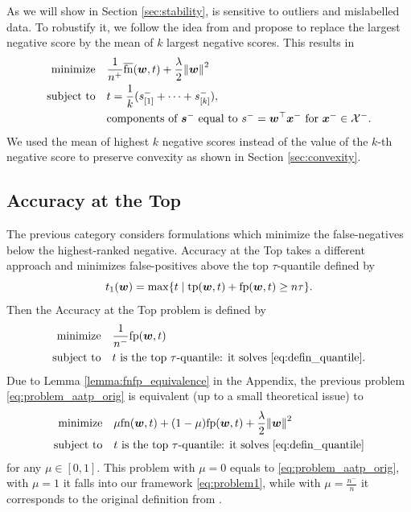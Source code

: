 As we will show in Section \ref{sec:stability}, \TopPush is sensitive to outliers and mislabelled data. To robustify it, we follow the idea from \cite{lapin2015top} and propose to replace the largest negative score by the mean of $k$ largest negative scores. This results in
\begin{equation}\label{eq:problem_toppushk}
  \begin{aligned}
    \minimize
    & \quad \frac{1}{n^{+}} \fns(\bm{w}, t) + \frac{\lambda}{2} \norm{\bm{w}}^2 \\
    \st
    & \quad t = \frac{1}{k}(s_{[1]}^- + \dots + s_{[k]}^-), \\
    & \quad \text{components of } \bm{s}^- \text{ equal to } s^-= \bm{w}^\top \bm{x}^- \text{ for }\bm{x}^- \in \Xc^-.
  \end{aligned}
\end{equation}
We used the mean of highest $k$ negative scores instead of the value of the $k$-th negative score to preserve convexity as shown in Section \ref{sec:convexity}.

\subsection{Accuracy at the Top}\label{sec:obj2}

The previous category considers formulations which minimize the false-negatives below the highest-ranked negative. Accuracy at the Top \cite{boyd2012accuracy} takes a different approach and minimizes false-positives above the top $\tau$-quantile defined by
\begin{equation}\label{eq:defin_quantile} 
  t_1(\bm{w}) = \max \Brac[c]{t \mid \tp(\bm{w}, t) + \fp(\bm{w}, t) \ge n \tau}.
\end{equation}
Then the Accuracy at the Top problem is defined by
\begin{equation}\label{eq:problem_aatp_orig}
  \begin{aligned}
    \operatorname*{minimize}
    & \quad \frac{1}{n^{-}}\textnormal{fp}(\bm{w},t) \\
    \operatorname{subject\ to}
    & \quad t \text{ is the top \ensuremath{\tau}-quantile: it solves } \eqref{eq:defin_quantile}.
  \end{aligned}
\end{equation}
Due to Lemma \ref{lemma:fnfp_equivalence} in the Appendix, the previous problem \eqref{eq:problem_aatp_orig} is equivalent (up to a small theoretical issue) to
\begin{equation}\label{eq:problem_aatp}
  \begin{aligned}
    \minimize
    & \quad \mu \fn(\bm{w}, t) + (1 - \mu)\fp(\bm{w}, t) + \frac{\lambda}{2}\norm{\bm{w}}^2\\
    \st
    & \quad t\text{ is the top \ensuremath{\tau}-quantile: it solves }\eqref{eq:defin_quantile}
  \end{aligned}
\end{equation}
for any $\mu \in [0,1]$. This problem with $\mu = 0$ equals to \eqref{eq:problem_aatp_orig}, with $\mu = 1$ it falls into our framework \eqref{eq:problem1}, while with $\mu = \frac{n^-}{n}$ it corresponds to the original definition from \cite{boyd2012accuracy}. 

